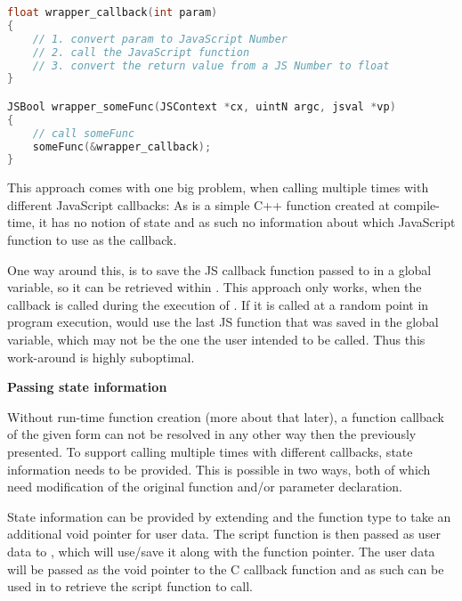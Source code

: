 \begin{lstlisting}[language=C++, caption=Wrapper code for handling methods that take function pointers \#1]
float wrapper_callback(int param)
{
	// 1. convert param to JavaScript Number
	// 2. call the JavaScript function
	// 3. convert the return value from a JS Number to float
}

JSBool wrapper_someFunc(JSContext *cx, uintN argc, jsval *vp)
{
	// call someFunc
	someFunc(&wrapper_callback);
}
\end{lstlisting}

This approach comes with one big problem, when calling  multiple times with different JavaScript callbacks: As  is a simple C++ function created at compile-time, it has no notion of state and as such no information about which JavaScript function to use as the callback.

One way around this, is to save the JS callback function passed to  in a global variable, so it can be retrieved within . This approach only works, when the callback is called during the execution of . If it is called at a random point in program execution,  would use the last JS function that was saved in the global variable, which may not be the one the user intended to be called. Thus this work-around is highly suboptimal.

\textbf{Passing state information}

Without run-time function creation (more about that later), a function callback of the given form can not be resolved in any other way then the previously presented. To support calling  multiple times with different callbacks, state information needs to be provided. This is possible in two ways, both of which need modification of the original function and/or parameter declaration.

State information can be provided by extending  and the function type to take an additional void pointer for user data. The script function is then passed as user data to , which will use/save it along with the function pointer. The user data will be passed as the void pointer to the C callback function and as such can be used in  to retrieve the script function to call.

